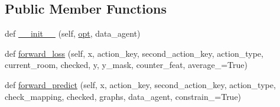\subsection*{Public Member Functions}
\begin{DoxyCompactItemize}
\item 
def \hyperlink{classprojects_1_1mastering__the__dungeon_1_1agents_1_1graph__world2_1_1models_1_1ObjectChecklistModel_acdb5472a97685c2d127df56337d4d3f0}{\+\_\+\+\_\+init\+\_\+\+\_\+} (self, \hyperlink{classprojects_1_1mastering__the__dungeon_1_1agents_1_1graph__world2_1_1models_1_1ObjectChecklistModel_acbc8185ff15b08c9a0c1040a461ef9eb}{opt}, data\+\_\+agent)
\item 
def \hyperlink{classprojects_1_1mastering__the__dungeon_1_1agents_1_1graph__world2_1_1models_1_1ObjectChecklistModel_a1308b00f5b1e8f1f621abf1c91cbc751}{forward\+\_\+loss} (self, x, action\+\_\+key, second\+\_\+action\+\_\+key, action\+\_\+type, current\+\_\+room, checked, y, y\+\_\+mask, counter\+\_\+feat, average\+\_\+=True)
\item 
def \hyperlink{classprojects_1_1mastering__the__dungeon_1_1agents_1_1graph__world2_1_1models_1_1ObjectChecklistModel_a14b0d48d232b33aa16052049a8bc7c1c}{forward\+\_\+predict} (self, x, action\+\_\+key, second\+\_\+action\+\_\+key, action\+\_\+type, check\+\_\+mapping, checked, graphs, data\+\_\+agent, constrain\+\_\+=True)
\end{DoxyCompactItemize}
